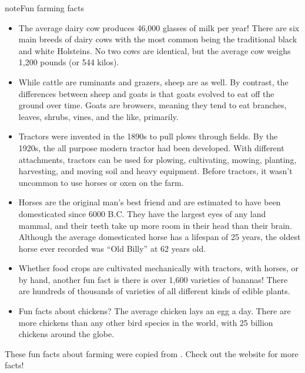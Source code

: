 \documentclass[letterpaper,10pt,english,openany,oneside]{sphinxmanual}
\begin{document}
\begin{sphinxadmonition}{note}{Fun farming facts}
\begin{itemize}
\item {} 
The average dairy cow produces 46,000 glasses of milk per year! There are six main breeds of dairy cows with the most common being the traditional black and white Holsteins. No two cows are identical, but the average cow weighs 1,200 pounds (or 544 kilos).

\item {} 
While cattle are ruminants and grazers, sheep are as well. By contrast, the differences between sheep and goats is that goats evolved to eat off the ground over time. Goats are browsers, meaning they tend to eat branches, leaves, shrubs, vines, and the like, primarily.

\item {} 
Tractors were invented in the 1890s to pull plows through fields. By the 1920s, the all purpose modern tractor had been developed. With different attachments, tractors can be used for plowing, cultivating, mowing, planting, harvesting, and moving soil and heavy equipment. Before tractors, it wasn’t uncommon to use horses or oxen on the farm.

\item {} 
Horses are the original man’s best friend and are estimated to have been domesticated since 6000 B.C. They have the largest eyes of any land mammal, and their teeth take up more room in their head than their brain. Although the average domesticated horse has a lifespan of 25 years, the oldest horse ever recorded was “Old Billy” at 62 years old.

\item {} 
Whether food crops are cultivated mechanically with tractors, with horses, or by hand, another fun fact is there is over 1,600 varieties of bananas! There are hundreds of thousands of varieties of all different kinds of edible plants.

\item {} 
Fun facts about chickens? The average chicken lays an egg a day. There are more chickens than any other bird species in the world, with 25 billion chickens around the globe.

\end{itemize}

These fun facts about farming were copied from . Check out the website for more facts!
\end{sphinxadmonition}
\end{document}
